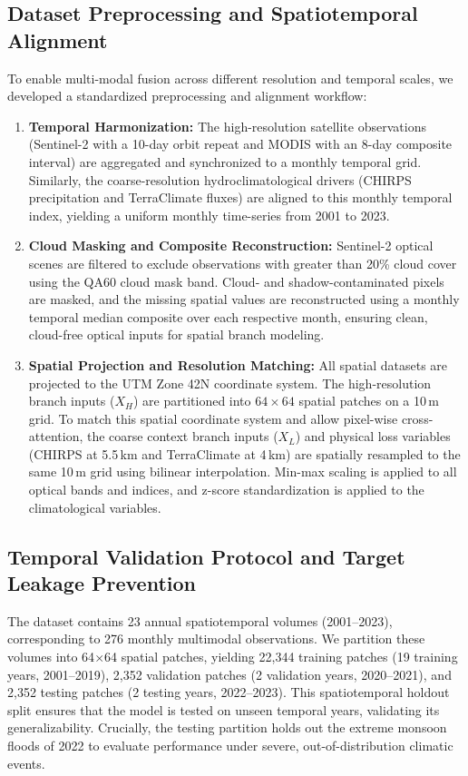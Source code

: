 \documentclass[preprint,12pt]{elsarticle}
\begin{document}
\subsection{Dataset Preprocessing and Spatiotemporal Alignment}
To enable multi-modal fusion across different resolution and temporal scales, we developed a standardized preprocessing and alignment workflow:
\begin{enumerate}
    \item \textbf{Temporal Harmonization:} The high-resolution satellite observations (Sentinel-2 with a 10-day orbit repeat and MODIS with an 8-day composite interval) are aggregated and synchronized to a monthly temporal grid. Similarly, the coarse-resolution hydroclimatological drivers (CHIRPS precipitation and TerraClimate fluxes) are aligned to this monthly temporal index, yielding a uniform monthly time-series from 2001 to 2023.
    \item \textbf{Cloud Masking and Composite Reconstruction:} Sentinel-2 optical scenes are filtered to exclude observations with greater than 20\% cloud cover using the QA60 cloud mask band. Cloud- and shadow-contaminated pixels are masked, and the missing spatial values are reconstructed using a monthly temporal median composite over each respective month, ensuring clean, cloud-free optical inputs for spatial branch modeling.
    \item \textbf{Spatial Projection and Resolution Matching:} All spatial datasets are projected to the UTM Zone 42N coordinate system. The high-resolution branch inputs ($X_H$) are partitioned into $64 \times 64$ spatial patches on a 10\,m grid. To match this spatial coordinate system and allow pixel-wise cross-attention, the coarse context branch inputs ($X_L$) and physical loss variables (CHIRPS at 5.5\,km and TerraClimate at 4\,km) are spatially resampled to the same 10\,m grid using bilinear interpolation. Min-max scaling is applied to all optical bands and indices, and z-score standardization is applied to the climatological variables.
\end{enumerate}

\subsection{Temporal Validation Protocol and Target Leakage Prevention}
The dataset contains 23 annual spatiotemporal volumes (2001--2023), corresponding to 276 monthly multimodal observations. We partition these volumes into 64$\times$64 spatial patches, yielding 22,344 training patches (19 training years, 2001--2019), 2,352 validation patches (2 validation years, 2020--2021), and 2,352 testing patches (2 testing years, 2022--2023). This spatiotemporal holdout split ensures that the model is tested on unseen temporal years, validating its generalizability. Crucially, the testing partition holds out the extreme monsoon floods of 2022 to evaluate performance under severe, out-of-distribution climatic events.
\end{document}
